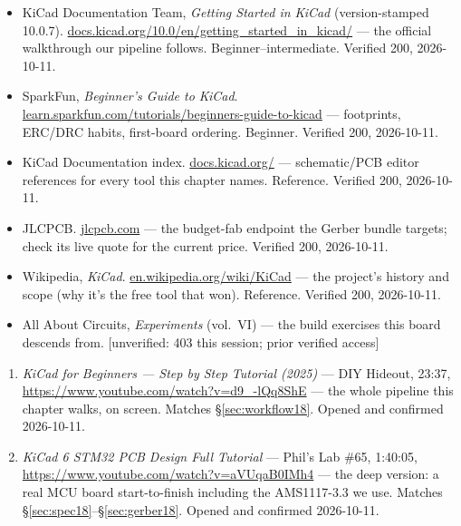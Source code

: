 \begin{itemize}
\item KiCad Documentation Team, \emph{Getting Started in KiCad}
(version-stamped 10.0.7).\newline
\url{docs.kicad.org/10.0/en/getting_started_in_kicad/} ---
the official walkthrough our pipeline follows.
Beginner--intermediate. Verified 200, 2026-10-11.
\item SparkFun, \emph{Beginner's Guide to KiCad}.\newline
\url{learn.sparkfun.com/tutorials/beginners-guide-to-kicad} ---
footprints, ERC/DRC habits, first-board ordering. Beginner.
Verified 200, 2026-10-11.
\item KiCad Documentation index.\newline
\url{docs.kicad.org/} --- schematic/PCB editor references for every
tool this chapter names. Reference. Verified 200, 2026-10-11.
\item JLCPCB.\newline
\url{jlcpcb.com} --- the budget-fab endpoint the Gerber bundle
targets; check its live quote for the current price. Verified 200,
2026-10-11.
\item Wikipedia, \emph{KiCad}.\newline
\url{en.wikipedia.org/wiki/KiCad} --- the project's history and
scope (why it's the free tool that won). Reference. Verified 200,
2026-10-11.
\item All About Circuits, \emph{Experiments} (vol.~VI) --- the build
exercises this board descends from. [unverified: 403 this session;
prior verified access]
\end{itemize}

\begin{rulebox}
\begin{enumerate}
\item \emph{KiCad for Beginners --- Step by Step Tutorial (2025)}
--- DIY Hideout, 23:37,
\url{https://www.youtube.com/watch?v=d9_-lQq8ShE} --- the whole
pipeline this chapter walks, on screen. Matches \S\ref{sec:workflow18}.
Opened and confirmed 2026-10-11.
\item \emph{KiCad 6 STM32 PCB Design Full Tutorial} --- Phil's Lab
\#65, 1:40:05, \url{https://www.youtube.com/watch?v=aVUqaB0IMh4}
--- the deep version: a real MCU board start-to-finish including the
AMS1117-3.3 we use. Matches \S\ref{sec:spec18}--\S\ref{sec:gerber18}.
Opened and confirmed 2026-10-11.
\end{enumerate}
\end{rulebox}

